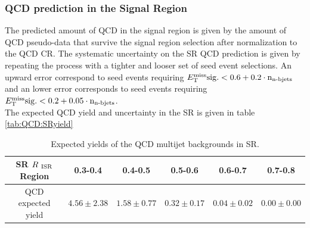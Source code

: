 \subsubsection*{QCD prediction in the Signal Region}

\indent The predicted amount of QCD in the signal region is given by the amount of QCD pseudo-data that survive the signal region selection after normalization to the QCD CR. The systematic uncertainty on the SR QCD prediction is given by repeating the process with a tighter and looser set of seed event selections.  An upward error correspond to seed events requiring $E_{\mathrm{T}}^{\mathrm{miss}}\rm{sig.} < 0.6 + 0.2\cdot n_{\textup{n-bjets}}$ and an lower error corresponds to seed events requiring $E_{\mathrm{T}}^{\mathrm{miss}}\rm{sig.} < 0.2 + 0.05\cdot n_{\textup{n-bjets}}$. \\

\indent The expected QCD yield and uncertainty in the SR is given in table \ref{tab:QCD:SRyield}

\begin{table}[!htbp]
  \begin{center}
    \begin{tabular}{c|c|c|c|c|c} \hline\hline
SR $R_{~\mathrm{ISR}}$ Region       & 0.3-0.4              & 0.4-0.5              & 0.5-0.6              & 0.6-0.7             & 0.7-0.8 \\ \hline
QCD expected yield & $4.56\pm2.38$ & $1.58\pm0.77$ & $0.32\pm0.17$ & $0.04\pm0.02$ & $0.00\pm0.00$ \\ \hline \hline
    \end{tabular}
  \caption{Expected yields of the QCD multijet backgrounds in SR.}
  \label{tab:QCDYields}
  \end{center}
\end{table}%
